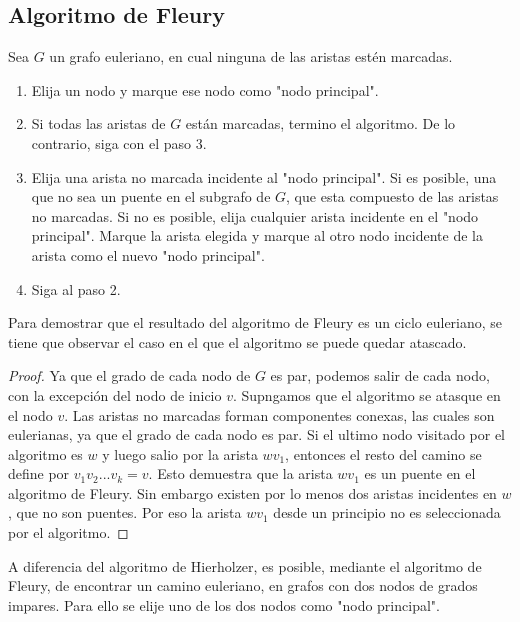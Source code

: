 \documentclass[12pt]{article}
\begin{document}
\subsection{Algoritmo de Fleury}
Sea $G$ un grafo euleriano, en cual ninguna de las aristas estén marcadas.
\begin{enumerate}
\item Elija un nodo y marque ese nodo como "nodo principal".
\item Si todas las aristas de $G$ están marcadas, termino el algoritmo. De lo contrario, siga con el paso 3.
\item Elija una arista no marcada incidente al "nodo principal". Si es posible, una que no sea un puente en el subgrafo de $G$, que esta compuesto de las aristas no marcadas. Si no es posible, elija cualquier arista incidente en el "nodo principal". Marque la arista elegida y marque al otro nodo incidente de la arista como el nuevo "nodo principal".
\item Siga al paso 2.
\end{enumerate}
Para demostrar que el resultado del algoritmo de Fleury es un ciclo euleriano, se tiene que observar el caso en el que el algoritmo se puede quedar atascado.
\begin{proof}
Ya que el grado de cada nodo de $G$ es par, podemos salir de cada nodo, con la excepción del nodo de inicio $v$. Supngamos que el algoritmo se atasque en el nodo $v$. Las aristas no marcadas forman componentes conexas, las cuales son eulerianas, ya que el grado de cada nodo es par. Si el ultimo nodo visitado por el algoritmo es $w$ y luego salio por la arista $wv_{1}$, entonces el resto del camino se define por $v_{1}v_{2}...v_{k}=v$. Esto demuestra que la arista $wv_{1}$ es un puente en el algoritmo de Fleury. Sin embargo existen por lo menos dos aristas incidentes en $w$, que no son puentes. Por eso la arista $wv_{1}$ desde un principio no es seleccionada por el algoritmo.
\end{proof}
A diferencia del algoritmo de Hierholzer, es posible, mediante el algoritmo de Fleury, de encontrar un camino euleriano, en grafos con dos nodos de grados impares. Para ello se elije uno de los dos nodos como "nodo principal".
\end{document}
